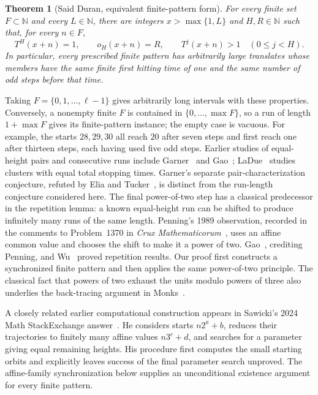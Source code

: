 \documentclass[11pt,a4paper]{article}
\newtheorem{theorem}{Theorem}
\begin{document}
\begin{theorem}[Said Duran, equivalent finite-pattern form]\label{thm:finite-pattern-hitting}
For every finite set $F\subset\mathbb N$ and every $L\in\mathbb N$,
there are integers $x>\max\{1,L\}$ and $H,R\in\mathbb N$ such that,
for every $n\in F$,
\begin{equation}\label{eq:finite-pattern-hitting}
T^H(x+n)=1,\qquad o_H(x+n)=R,\qquad
T^j(x+n)>1\quad(0\le j<H).
\end{equation}
In particular, every prescribed finite pattern has arbitrarily large
translates whose members have the same finite first hitting time of
one and the same number of odd steps before that time.
\end{theorem}

Taking $F=\{0,1,\ldots,\ell-1\}$ gives arbitrarily long intervals
with these properties. Conversely, a nonempty finite $F$ is contained
in $\{0,\ldots,\max F\}$, so a run of length $1+\max F$ gives
its finite-pattern instance; the empty case is vacuous.
For example, the starts $28,29,30$ all
reach $20$ after seven steps and first reach one after thirteen
steps, each having used five odd steps.
Earlier studies of equal-height pairs and consecutive runs include
Garner~\cite{Garner1985} and Gao~\cite{Gao1993};
LaDue~\cite{LaDue2018} studies clusters with equal total stopping times.
Garner's separate pair-characterization conjecture, refuted by
Elia and Tucker~\cite{EliaTucker2015}, is distinct from the run-length
conjecture considered here.
The final power-of-two step has a classical predecessor in the repetition
lemma: a known equal-height run can be shifted to produce infinitely
many runs of the same length. Penning's 1989 observation, recorded in
the comments to Problem~1370 in \emph{Crux Mathematicorum}~\cite{Penning1989},
uses an affine common value and chooses the shift to make it a power of
two. Gao~\cite[Lemma~1]{Gao1993}, crediting Penning, and
Wu~\cite{Wu1993} proved repetition results. Our proof first constructs
a synchronized finite pattern and then applies the same power-of-two
principle. The classical fact that powers of two exhaust the units
modulo powers of three also underlies the back-tracing argument in
Monks~\cite[Lemma~3.4]{Monks2006}.

A closely related earlier computational construction appears in
Sawicki's 2024 Math StackExchange answer~\cite{Sawicki2024}. He considers
starts $n2^a+b$, reduces their trajectories to finitely many affine
values $n3^c+d$, and searches for a parameter giving equal remaining
heights. His procedure first computes the small starting orbits and
explicitly leaves success of the final parameter search unproved.
The affine-family synchronization below supplies an unconditional
existence argument for every finite pattern.
\end{document}
